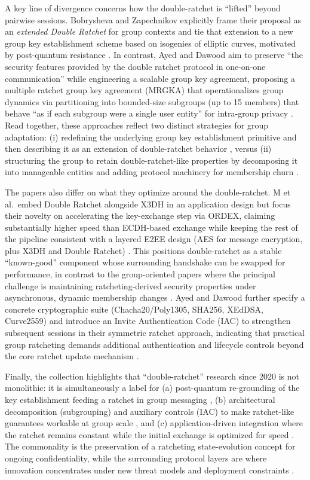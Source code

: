 A key line of divergence concerns how the double-ratchet is “lifted” beyond pairwise sessions. Bobrysheva and Zapechnikov explicitly frame their proposal as an \emph{extended Double Ratchet} for group contexts and tie that extension to a new group key establishment scheme based on isogenies of elliptic curves, motivated by post-quantum resistance \cite{bobrysheva2021}. In contrast, Ayed and Dawood aim to preserve “the security features provided by the double ratchet protocol in one-on-one communication” while engineering a scalable group key agreement, proposing a multiple ratchet group key agreement (MRGKA) that operationalizes group dynamics via partitioning into bounded-size subgroups (up to 15 members) that behave “as if each subgroup were a single user entity” for intra-group privacy \cite{ayed2025}. Read together, these approaches reflect two distinct strategies for group adaptation: (i) redefining the underlying group key establishment primitive and then describing it as an extension of double-ratchet behavior \cite{bobrysheva2021}, versus (ii) structuring the group to retain double-ratchet-like properties by decomposing it into manageable entities and adding protocol machinery for membership churn \cite{ayed2025}.

The papers also differ on what they optimize around the double-ratchet. M et al.\ embed Double Ratchet alongside X3DH in an application design but focus their novelty on accelerating the key-exchange step via ORDEX, claiming substantially higher speed than ECDH-based exchange while keeping the rest of the pipeline consistent with a layered E2EE design (AES for message encryption, plus X3DH and Double Ratchet) \cite{m2024}. This positions double-ratchet as a stable “known-good” component whose surrounding handshake can be swapped for performance, in contrast to the group-oriented papers where the principal challenge is maintaining ratcheting-derived security properties under asynchronous, dynamic membership changes \cite{ayed2025,bobrysheva2021}. Ayed and Dawood further specify a concrete cryptographic suite (Chacha20/Poly1305, SHA256, XEdDSA, Curve2559) and introduce an Invite Authentication Code (IAC) to strengthen subsequent sessions in their symmetric ratchet approach, indicating that practical group ratcheting demands additional authentication and lifecycle controls beyond the core ratchet update mechanism \cite{ayed2025}.

Finally, the collection highlights that “double-ratchet” research since 2020 is not monolithic: it is simultaneously a label for (a) post-quantum re-grounding of the key establishment feeding a ratchet in group messaging \cite{bobrysheva2021}, (b) architectural decomposition (subgrouping) and auxiliary controls (IAC) to make ratchet-like guarantees workable at group scale \cite{ayed2025}, and (c) application-driven integration where the ratchet remains constant while the initial exchange is optimized for speed \cite{m2024}. The commonality is the preservation of a ratcheting state-evolution concept for ongoing confidentiality, while the surrounding protocol layers are where innovation concentrates under new threat models and deployment constraints \cite{bobrysheva2021,ayed2025,m2024}.

